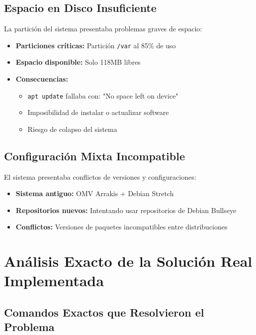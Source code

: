 \documentclass[12pt, a4paper]{article}
\begin{document}
\subsection{Espacio en Disco Insuficiente}
\label{subsec:espacio_insuficiente}

La partición del sistema presentaba problemas graves de espacio:

\begin{itemize}
    \item \textbf{Particiones críticas:} Partición \texttt{/var} al 85\% de uso
    \item \textbf{Espacio disponible:} Solo 118MB libres
    \item \textbf{Consecuencias:}
    \begin{itemize}
        \item \texttt{apt update} fallaba con: "No space left on device"
        \item Imposibilidad de instalar o actualizar software
        \item Riesgo de colapso del sistema
    \end{itemize}
\end{itemize}

\subsection{Configuración Mixta Incompatible}
\label{subsec:configuracion_incompatible}

El sistema presentaba conflictos de versiones y configuraciones:

\begin{itemize}
    \item \textbf{Sistema antiguo:} OMV Arrakis + Debian Stretch
    \item \textbf{Repositorios nuevos:} Intentando usar repositorios de Debian Bullseye
    \item \textbf{Conflictos:} Versiones de paquetes incompatibles entre distribuciones
\end{itemize}

\clearpage

\section{Análisis Exacto de la Solución Real Implementada}
\label{sec:analisis_exacto}

\subsection{Comandos Exactos que Resolvieron el Problema}
\label{subsec:comandos_exactos}
\end{document}
